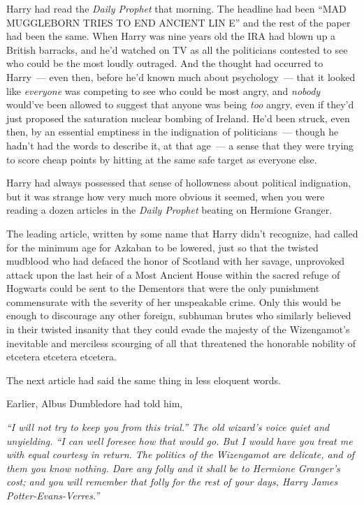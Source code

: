 Harry had read the \emph{Daily Prophet} that morning. The headline had been ``MAD MUGGLEBORN TRIES TO END ANCIENT LIN E'' and the rest of the paper had been the same. When Harry was nine years old the IRA had blown up a British barracks, and he'd watched on TV as all the politicians contested to see who could be the most loudly outraged. And the thought had occurred to Harry~--- even then, before he'd known much about psychology~--- that it looked like \emph{everyone} was competing to see who could be most angry, and \emph{nobody} would've been allowed to suggest that anyone was being \emph{too} angry, even if they'd just proposed the saturation nuclear bombing of Ireland. He'd been struck, even then, by an essential emptiness in the indignation of politicians~--- though he hadn't had the words to describe it, at that age~--- a sense that they were trying to score cheap points by hitting at the same safe target as everyone else.

Harry had always possessed that sense of hollowness about political indignation, but it was strange how very much more obvious it seemed, when you were reading a dozen articles in the \emph{Daily Prophet} beating on Hermione Granger.

The leading article, written by some name that Harry didn't recognize, had called for the minimum age for Azkaban to be lowered, just so that the twisted mudblood who had defaced the honor of Scotland with her savage, unprovoked attack upon the last heir of a Most Ancient House within the sacred refuge of Hogwarts could be sent to the Dementors that were the only punishment commensurate with the severity of her unspeakable crime. Only this would be enough to discourage any other foreign, subhuman brutes who similarly believed in their twisted insanity that they could evade the majesty of the Wizengamot's inevitable and merciless scourging of all that threatened the honorable nobility of etcetera etcetera etcetera.

The next article had said the same thing in less eloquent words.

Earlier, Albus Dumbledore had told him,

\emph{``I will not try to keep you from this trial.'' The old wizard's voice quiet and unyielding. ``I can well foresee how that would go. But I would have you treat me with equal courtesy in return. The politics of the Wizengamot are delicate, and of them you know nothing. Dare any folly and it shall be to Hermione Granger's cost; and you will remember that folly for the rest of your days, Harry James Potter-Evans-Verres.''}


